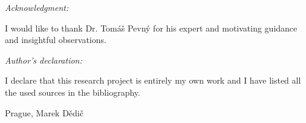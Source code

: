\noindent \textit{\Large Acknowledgment:}

\noindent I would like to thank Dr. Tomáš Pevný for his expert and motivating guidance and insightful observations.

\vfill

\noindent \textit{\Large Author's declaration:}

\noindent I declare that this research project is entirely my own work and I have listed all the used sources in the bibliography.

\bigskip

\noindent Prague, \documentdate\hfill Marek Dědič

\vspace{2cm}
